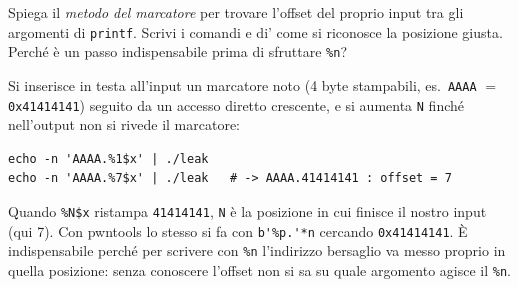 \question[5]
Spiega il \emph{metodo del marcatore} per trovare l'offset del proprio input tra gli argomenti di \lstinline|printf|. Scrivi i comandi e di' come si riconosce la posizione giusta. Perché è un passo indispensabile prima di sfruttare \lstinline|%n|?
\begin{solution}
Si inserisce in testa all'input un marcatore noto (4 byte stampabili, es.\ \lstinline|AAAA| $=$ \lstinline|0x41414141|) seguito da un accesso diretto crescente, e si aumenta \lstinline|N| finché nell'output non si rivede il marcatore:
\begin{lstlisting}[style=sh]
echo -n 'AAAA.%1$x' | ./leak
echo -n 'AAAA.%7$x' | ./leak   # -> AAAA.41414141 : offset = 7
\end{lstlisting}
Quando \lstinline|%N$x| ristampa \lstinline|41414141|, \lstinline|N| è la posizione in cui finisce il nostro input (qui 7). Con pwntools lo stesso si fa con \lstinline|b'%p.'*n| cercando \lstinline|0x41414141|.
È indispensabile perché per scrivere con \lstinline|%n| l'indirizzo bersaglio va messo proprio in quella posizione: senza conoscere l'offset non si sa su quale argomento agisce il \lstinline|%n|.
\end{solution}

